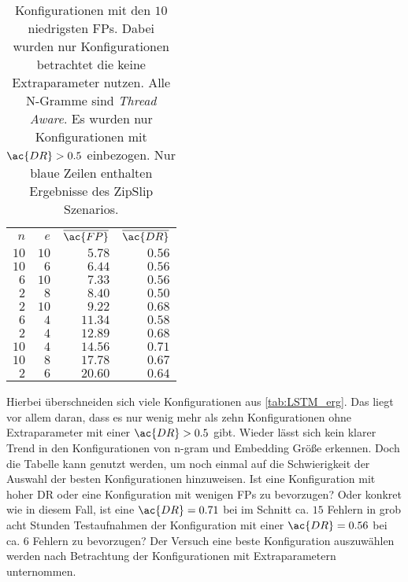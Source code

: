     \begin{table}[ht]
        \centering
        \begin{tabular}{rrrr}
            \hline
            \rowcolor{GruvGray!36}
            \multicolumn{4}{c}{Ohne Extraparameter, nach \ac{FP}}\\
            \toprule
            $n$ & $e$ & $\overline{\ac{FP}}$ & $\overline{\ac{DR}}$ \\
            \midrule
            \rowcolor{GruvGray!16}
            $10$ & 	$10$ & 	$5.78$ & 	    $0.56$ \\
            $10$ & 	$6$ & 	$6.44$ & 	    $0.56$ \\
            \rowcolor{GruvGray!16}
            $6$ & 	$10$ & 	$7.33$ & 	    $0.56$ \\
            \rowcolor{CTblue!16}
            $2$ & 	$8$ & 	$8.40$ & 	    $0.50$ \\
            \rowcolor{GruvGray!16}
            $2$ & 	$10$ & 	$9.22$ & 	    $0.68$ \\
            $6$ & 	$4$ & 	$11.34$ & 	$0.58$ \\
            \rowcolor{GruvGray!16}
            $2$ & 	$4$ & 	$12.89$ & 	$0.68$ \\
            $10$ & 	$4$ & 	$14.56$ & 	$0.71$ \\
            \rowcolor{GruvGray!16}
            $10$ & 	$8$ & 	$17.78$ & 	$0.67$ \\
            \rowcolor{CTblue!16}
            $2$ & 	$6$ & 	$20.60$ & 	$0.64$ \\
            \hline
        \end{tabular}
        \caption[Ergebnisse \ac{FP}-Rate ohne Extraparameter]{Konfigurationen mit den $10$ niedrigsten \acp{FP}. 
                 Dabei wurden nur Konfigurationen betrachtet die keine Extraparameter nutzen.
                 Alle N-Gramme sind \textit{Thread Aware}.
                 Es wurden nur Konfigurationen mit $\ac{DR}>0.5$ einbezogen.
                 Nur blaue Zeilen enthalten Ergebnisse des ZipSlip Szenarios.}
        \label{tab:LSTM_erg_FP}
    \end{table}
    
    Hierbei überschneiden sich viele Konfigurationen aus \autoref{tab:LSTM_erg}.
    Das liegt vor allem daran, dass es nur wenig mehr als zehn Konfigurationen ohne Extraparameter mit einer $\ac{DR}>0.5$ gibt.
    Wieder lässt sich kein klarer Trend in den Konfigurationen von n-gram und Embedding Größe erkennen.
    Doch die Tabelle kann genutzt werden, um noch einmal auf die Schwierigkeit der Auswahl der besten Konfigurationen hinzuweisen.
    Ist eine Konfiguration mit hoher \ac{DR} oder eine Konfiguration mit wenigen \acp{FP} zu bevorzugen?
    Oder konkret wie in diesem Fall, ist eine $\ac{DR}=0.71$ bei im Schnitt ca. $15$ Fehlern in grob acht Stunden Testaufnahmen der Konfiguration mit einer $\ac{DR}=0.56$ bei ca. $6$ Fehlern zu bevorzugen?
    Der Versuch eine beste Konfiguration auszuwählen werden nach Betrachtung der Konfigurationen mit Extraparametern unternommen.\par\medskip

